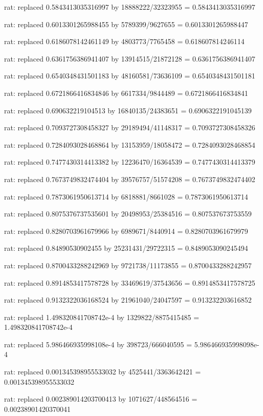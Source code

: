 \documentclass[a4paper,10pt]{article}
\begin{document}
\begin{eulernotebook}
\begin{eulercomment}
\begin{eulercomment}
\begin{eulercomment}
\begin{eulercomment}
\begin{eulercomment}
\begin{eulercomment}
\begin{eulercomment}
\begin{eulercomment}
\begin{eulercomment}
\begin{eulercomment}
\begin{eulercomment}
\begin{eulercomment}
\begin{eulercomment}
\begin{eulercomment}
\begin{eulercomment}
\begin{eulercomment}
\begin{euleroutput}
  rat: replaced 0.5843413035316997 by 18888222/32323955 = 0.5843413035316997
  
  rat: replaced 0.6013301265988455 by 5789399/9627655 = 0.6013301265988447
  
  rat: replaced 0.6186078142461149 by 4803773/7765458 = 0.618607814246114
  
  rat: replaced 0.6361756386941407 by 13914515/21872128 = 0.6361756386941407
  
  rat: replaced 0.6540348431501183 by 48160581/73636109 = 0.6540348431501181
  
  rat: replaced 0.6721866416834846 by 6617334/9844489 = 0.6721866416834841
  
  rat: replaced 0.690632219104513 by 16840135/24383651 = 0.6906322191045139
  
  rat: replaced 0.7093727308458327 by 29189494/41148317 = 0.7093727308458326
  
  rat: replaced 0.7284093028468864 by 13153959/18058472 = 0.7284093028468854
  
  rat: replaced 0.7477430314413382 by 12236470/16364539 = 0.7477430314413379
  
  rat: replaced 0.7673749832474404 by 39576757/51574208 = 0.7673749832474402
  
  rat: replaced 0.7873061950613714 by 6818881/8661028 = 0.7873061950613714
  
  rat: replaced 0.8075376737535601 by 20498953/25384516 = 0.807537673753559
  
  rat: replaced 0.8280703961679966 by 6989671/8440914 = 0.8280703961679979
  
  rat: replaced 0.84890530902455 by 25231431/29722315 = 0.8489053090245494
  
  rat: replaced 0.8700433288242969 by 9721738/11173855 = 0.8700433288242957
  
  rat: replaced 0.8914853417578728 by 33469619/37543656 = 0.8914853417578725
  
  rat: replaced 0.9132322036168524 by 21961040/24047597 = 0.913232203616852
  
  rat: replaced 1.498320841708742e-4 by 1329822/8875415485 = 1.498320841708742e-4
  
  rat: replaced 5.986466935998108e-4 by 398723/666040595 = 5.986466935998098e-4
  
  rat: replaced 0.001345398955533032 by 4525441/3363642421 = 0.001345398955533032
  
  rat: replaced 0.002389014203700413 by 1071627/448564516 = 0.00238901420370041
  

\end{euleroutput}
\end{eulercomment}
\end{eulercomment}
\end{eulercomment}
\end{eulercomment}
\end{eulercomment}
\end{eulercomment}
\end{eulercomment}
\end{eulercomment}
\end{eulercomment}
\end{eulercomment}
\end{eulercomment}
\end{eulercomment}
\end{eulercomment}
\end{eulercomment}
\end{eulercomment}
\end{eulercomment}
\end{eulernotebook}
\end{document}
